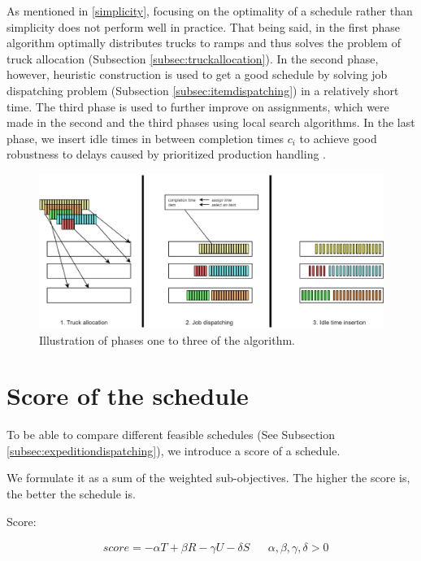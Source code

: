 \documentclass{ctuthesis}
\begin{document}
As mentioned in \ref{simplicity}, focusing on the optimality of a schedule rather than simplicity does not perform well in practice. That being said, in the first phase algorithm optimally distributes trucks to ramps and thus solves the problem of truck allocation (Subsection \ref{subsec:truckallocation}). In the second phase, however, heuristic construction is used to get a good schedule by solving job dispatching problem (Subsection \ref{subsec:itemdispatching}) in a relatively short time. The third phase is used to further improve on assignments, which were made in the second and the third phases using local search algorithms. In the last phase, we insert idle times in between completion times $c_i$ to achieve good robustness to delays caused by prioritized production handling \cite{pinedo}. 

\begin{figure}[H]
\includegraphics[width=1.0\linewidth]{algo.jpg}
\caption{Illustration of phases one to three of the algorithm.}
\end{figure}

\section{Score of the schedule}

To be able to compare different feasible schedules (See Subsection \ref{subsec:expeditiondispatching}), we introduce a score of a schedule. 

We formulate it as a sum of the weighted sub-objectives. The higher the score is, the better the schedule is.

Score:

\begin{equation}
\begin{aligned}
    &score = -\alpha T + \beta R - \gamma  U - \delta S && \alpha, \beta, \gamma, \delta > 0
\end{aligned}
\end{equation}
\end{document}
